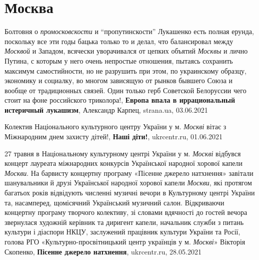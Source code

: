  
 
 
 
 
\chapter{Москва}
\label{sec:slova.moskva}

Болтовня о \emph{промосковскости} и \enquote{пропутинскости} Лукашенко есть полная ерунда,
поскольку все эти годы бацька только то и делал, что балансировал между \emph{Москвой}
и Западом, всячески уворачивался от цепких объятий \emph{Москвы} и лично Путина, с
которым у него очень непростые отношения, пытаясь сохранить максимум
самостийности, но не разрушить при этом, по украинскому образцу, экономику и
социалку, во многом зависящую от рынков бывшего Союза и вообще от традиционных
связей. Один только герб Советской Белоруссии чего стоит на фоне российского
триколора!,
\textbf{Европа впала в иррациональный истеричный лукашизм}, Александр Карпец,
strana.ua, 03.06.2021

Колектив Національного культурного центру України у м. \emph{Москві} вітає з Міжнародним днем захисту дітей!, 
\textbf{Наші діти!}, ukrcentr.ru, 01.06.2021

27 травня в Національному культурному центрі України у м. \emph{Москві} відбувся
концерт лауреата міжнародних конкурсів Української народної хорової капели
\emph{Москви}. На барвисту концертну програму «Пісенне джерело натхнення» завітали
шанувальники й друзі Української народної хорової капели \emph{Москви}, які протягом
багатьох років відвідують численні музичні вечори в Культурному центрі України
та, насамперед, щомісячний Український музичний салон. Відкриваючи концертну
програму творчого колективу, зі словами вдячності до гостей вечора звернулася
художній керівник та диригент капели, начальник служби з питань культури і
діаспори НКЦУ, заслужений працівник культури України та Росії, голова РГО
«Культурно-просвітницький центр українців у м. \emph{Москві}» Вікторія Скопенко,
\textbf{Пісенне джерело натхнення}, ukrcentr.ru, 28.05.2021

